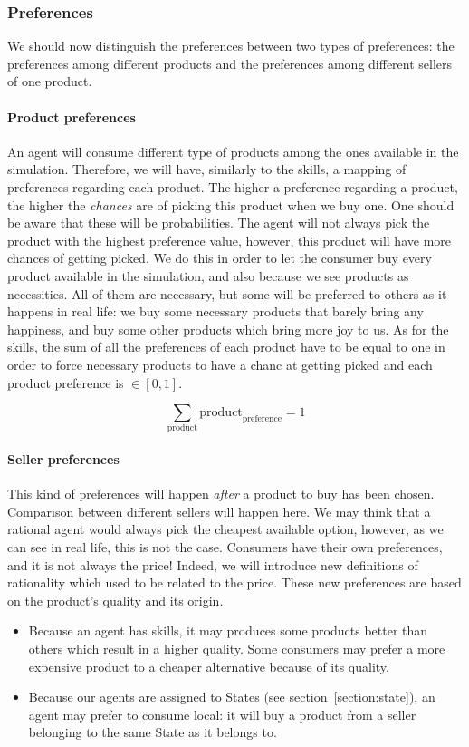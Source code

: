 \documentclass[20pt]{article}
\begin{document}
\subsubsection{Preferences}\label{section:preferences}
We should now distinguish the preferences between two types of preferences: the preferences among different products and the preferences among different sellers of one product.

\paragraph{Product preferences} An agent will consume different type of products among the ones available in the simulation. Therefore, we will have, similarly to the skills, a mapping of preferences regarding each product. The higher a preference regarding a product, the higher the \emph{chances} are of picking this product when we buy one. One should be aware that these will be probabilities. The agent will not always pick the product with the highest preference value, however, this product will have more chances of getting picked.
We do this in order to let the consumer buy every product available in the simulation, and also because we see products as necessities. All of them are necessary, but some will be preferred to others as it happens in real life: we buy some necessary products that barely bring any happiness, and buy some other products which bring more joy to us.
As for the skills, the sum of all the preferences of each product have to be equal to one in order to force necessary products to have a chanc at getting picked and each product preference is $\in [0,1]$.

$$\sum_{\text{product}} \text{product}_{\text{preference}} = 1$$

\paragraph{Seller preferences}
This kind of preferences will happen \emph{after} a product to buy has been chosen. Comparison between different sellers will happen here.
We may think that a rational agent would always pick the cheapest available option, however, as we can see in real life, this is not the case. Consumers have their own preferences, and it is not always the price! Indeed, we will introduce new definitions of rationality which used to be related to the price. These new preferences are based on the product's quality and its origin.

\begin{itemize}
    \item Because an agent has skills, it may produces some products better than others which result in a higher quality. Some consumers may prefer a more expensive product to a cheaper alternative because of its quality.
    \item Because our agents are assigned to States (see section~\ref{section:state}), an agent may prefer to consume local: it will buy a product from a seller belonging to the same State as it belongs to.
\end{itemize}
\end{document}
